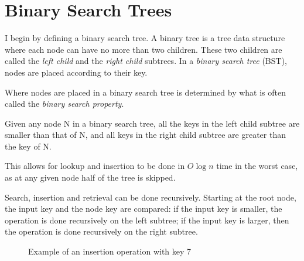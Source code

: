 
\section{Binary Search Trees} 
I begin by defining a binary search tree. A binary tree is a tree data structure where each node can have no more than two children. These two children are 
called the \textit{left child} and the \textit{right child} subtrees. In a \textit{binary search tree} (BST), nodes are placed according to their key. 

Where nodes are placed in a binary search tree is determined by what is often called the \textit{binary search property}.

\begin{definition}
  \label{def:bst_property}
  Given any node N in a binary search tree, all the keys in the left child subtree are smaller than that of N, and all keys in the right child subtree are greater than the 
  key of N.
\end{definition}

This allows for lookup and insertion to be done in $O \log n$ time in the worst case, as at any given node half of the tree is skipped.

Search, insertion and retrieval can be done recursively. Starting at the root node, the input key and the node key are compared: if the input key is smaller,
the operation is done recursively on the left subtree; if the input key is larger, then the operation is done recursively on the right subtree.

\begin{figure}[!h]
  \centering
  \hspace{1cm}%
    \hspace{1cm}%
    \caption{Example of an insertion operation with key 7}
    \label{fig:insert}
\end{figure}

